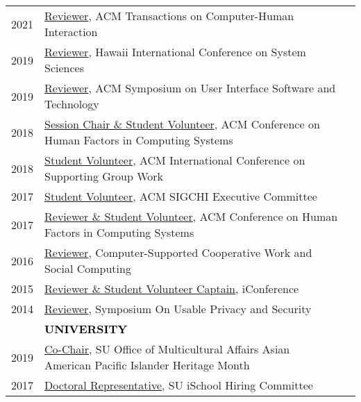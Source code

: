 \documentclass[11pt]{article}
\begin{document}
{{\begin{longtable}{Rp{0.75in}p{5.0in}}
\footnotesize{2021} & 
\href{https://dl.acm.org/journal/tochi}{{Reviewer}}, ACM Transactions on Computer-Human Interaction\\

\footnotesize{2019} & \href{https://hicss.hawaii.edu/}{{Reviewer}}, Hawaii International Conference on System Sciences\\

\footnotesize{2019} & \href{http://uist.acm.org/uist2019/}{{Reviewer}}, ACM Symposium on User Interface Software and Technology\\

\footnotesize{2018} & \href{https://chi2018.acm.org}{{Session Chair \& Student Volunteer}}, ACM Conference on Human Factors in Computing Systems\\

\footnotesize{2018} & \href{https://group.acm.org/conferences/group18/index.html}{{Student Volunteer}}, ACM International Conference on Supporting Group Work\\

\footnotesize{2017} & \href{https://sigchi.org/}{{Student Volunteer}}, ACM SIGCHI Executive Committee\\

\footnotesize{2017} & \href{https://chi2017.acm.org/}{{Reviewer \& Student Volunteer}}, ACM Conference on Human Factors in Computing Systems\\

\footnotesize{2016} & \href{https://cscw.acm.org/}{{Reviewer}}, Computer-Supported Cooperative Work and Social Computing\\

\footnotesize{2015} & \href{https://ischools.org/the-iconference/}{{Reviewer \& Student Volunteer Captain}}, iConference\\

\footnotesize{2014} & \href{https://www.usenix.org/sites/default/files/soups14_proceedings.pdf}{{Reviewer}}, Symposium On Usable Privacy and Security\\

& \textcolor{black}{\uppercase{\textbf{University}}}\\

\footnotesize{2019} & \href{http://dailyorange.com/2019/04/su-alum-deliver-lecture-industry-experience-cultural-identity-aapi-month/}{{Co-Chair}}, SU Office of Multicultural Affairs Asian American Pacific Islander Heritage Month\\

\footnotesize{2017} & \href{https://ischool.syr.edu/}{{Doctoral Representative}}, SU iSchool Hiring Committee\\


\end{longtable}}}
\end{document}
